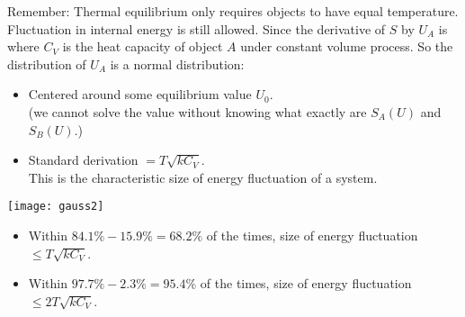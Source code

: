 \documentclass[class=article, crop=false, 12pt]{standalone}
\begin{document}
Remember: Thermal equilibrium only requires objects to have equal temperature.
Fluctuation in internal energy is still allowed.
Since the  derivative of $S$ by $U_A$ is 
where $C_V$ is the heat capacity of object $A$ under constant volume process.
So the distribution of $U_A$ is a normal distribution:
\begin{itemize}
    \item Centered around some equilibrium value $U_{0}$.\\
    (we cannot solve the value without knowing what exactly are $S_A(U)$ and $S_B(U)$.)

    \item Standard derivation $= T\sqrt{kC_V}$.\\
    This is the characteristic size of energy fluctuation of a system.
\end{itemize}

\begin{center}
    \begin{minipage}{0.8\linewidth}
        \centering
        \texttt{[image: gauss2]}
    \end{minipage}
\end{center}

\begin{itemize}
    \item Within $84.1\%-15.9\%= 68.2\%$ of the times,
    size of energy fluctuation $\leq T\sqrt{kC_V}$.

    \item Within $97.7\%-2.3\%= 95.4\%$ of the times,
    size of energy fluctuation $\leq 2T\sqrt{kC_V}$.
\end{itemize}
\end{document}

